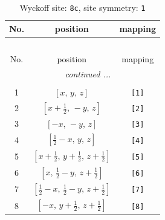 \documentclass[fleqn,8pt]{jsarticle}
\begin{document}
\renewcommand{\arraystretch}{1.2}
\begin{longtable}{ccc}
\caption{Wyckoff site: {\tt 8c}, site symmetry: {\tt 1}}
 \\
 \hline \hline
No. & position & mapping \\ \hline \endfirsthead

\multicolumn{2}{l}{\tablename\ \thetable{}} \\
 \hline \hline
No. & position & mapping \\ \hline \endhead

 \hline \hline
\multicolumn{2}{r}{\footnotesize\it continued ...} \\ \endfoot

 \hline \hline
\multicolumn{2}{r}{} \\ \endlastfoot

1 & $\left[ x,\, y,\, z \right]$ & {\tt [1]} \\ \hline
2 & $\left[ x + \frac{1}{2},\, - y,\, z \right]$ & {\tt [2]} \\ \hline
3 & $\left[ - x,\, - y,\, z \right]$ & {\tt [3]} \\ \hline
4 & $\left[ \frac{1}{2} - x,\, y,\, z \right]$ & {\tt [4]} \\ \hline
5 & $\left[ x + \frac{1}{2},\, y + \frac{1}{2},\, z + \frac{1}{2} \right]$ & {\tt [5]} \\ \hline
6 & $\left[ x,\, \frac{1}{2} - y,\, z + \frac{1}{2} \right]$ & {\tt [6]} \\ \hline
7 & $\left[ \frac{1}{2} - x,\, \frac{1}{2} - y,\, z + \frac{1}{2} \right]$ & {\tt [7]} \\ \hline
8 & $\left[ - x,\, y + \frac{1}{2},\, z + \frac{1}{2} \right]$ & {\tt [8]} \\
\end{longtable}
\end{document}
